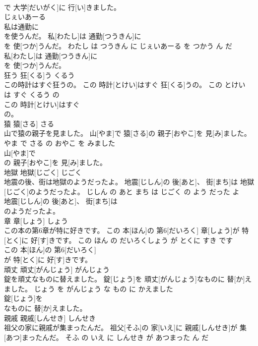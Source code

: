\documentclass[8pt]{extreport}
\begin{document}
\begin{CJK}{UTF8}{min}
\\	で 大学[だいがく]に 行[い]きました。			
\\	[じぇいあーる]	じぇいあーる	
\\	私は通勤に
\\	を使うんだ。	私[わたし]は 通勤[つうきん]に 
\\	[じぇいあーる]を 使[つか]うんだ。	わたし は つうきん に じぇいあーる を つかう ん だ	
\\	私[わたし]は 通勤[つうきん]に
\\	を 使[つか]うんだ。			
\\	狂う	狂[くる]う	くるう	
\\	この時計はすぐ狂うの。	この 時計[とけい]はすぐ 狂[くる]うの。	この とけい は すぐ くるう の	
\\	この 時計[とけい]はすぐ
\\	の。			
\\	猿	猿[さる]	さる	
\\	山で猿の親子を見ました。	山[やま]で 猿[さる]の 親子[おやこ]を 見[み]ました。	やま で さる の おやこ を みました	
\\	山[やま]で
\\	の 親子[おやこ]を 見[み]ました。			
\\	地獄	地獄[じごく]	じごく	
\\	地震の後、街は地獄のようだったよ。	地震[じしん]の 後[あと]、 街[まち]は 地獄[じごく]のようだったよ。	じしん の あと まち は じごく の よう だった よ	
\\	地震[じしん]の 後[あと]、 街[まち]は
\\	のようだったよ。			
\\	章	章[しょう]	しょう	
\\	この本の第6章が特に好きです。	この 本[ほん]の 第6[だいろく] 章[しょう]が 特[とく]に 好[す]きです。	この ほん の だいろくしょう が とくに すき です	
\\	この 本[ほん]の 第6[だいろく]
\\	が 特[とく]に 好[す]きです。			
\\	頑丈	頑丈[がんじょう]	がんじょう	
\\	錠を頑丈なものに替えました。	錠[じょう]を 頑丈[がんじょう]なものに 替[か]えました。	じょう を がんじょう な もの に かえました	
\\	錠[じょう]を
\\	なものに 替[か]えました。			
\\	親戚	親戚[しんせき]	しんせき	
\\	祖父の家に親戚が集まったんだ。	祖父[そふ]の 家[いえ]に 親戚[しんせき]が 集[あつ]まったんだ。	そふ の いえ に しんせき が あつまった ん だ	

\end{CJK}
\end{document}
